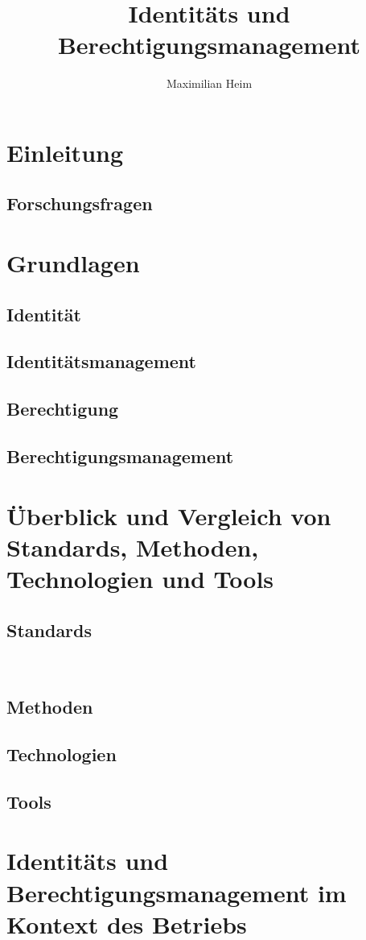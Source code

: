 \documentclass[10pt]{article}
\author{Maximilian Heim}
\title{Identitäts und Berechtigungsmanagement}
\begin{document}
\maketitle
\newpage
\tableofcontents
\newpage
\section{Einleitung}
\subsection{Forschungsfragen}
\section{Grundlagen}
\subsection{Identität}
\subsection{Identitätsmanagement}
\subsection{Berechtigung}
\subsection{Berechtigungsmanagement}
\section{Überblick und Vergleich von Standards, Methoden, Technologien und Tools}
\subsection{Standards}
~\cite{ORP42020}
\subsection{Methoden}
\subsection{Technologien}
\subsection{Tools}
\section{Identitäts und Berechtigungsmanagement im Kontext des Betriebs}
\end{document}
